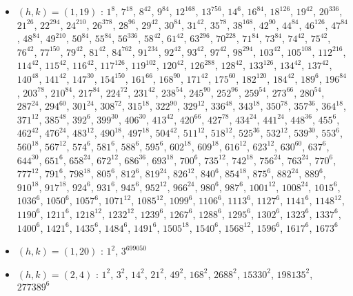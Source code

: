 \begin{itemize}
\item $(h,k)=(1,19)$ : $1^{8}$, $7^{18}$, $8^{42}$, $9^{84}$, $12^{168}$, $13^{756}$, $14^{6}$, $16^{84}$, $18^{126}$, $19^{42}$, $20^{336}$, $21^{26}$, $22^{294}$, $24^{210}$, $26^{378}$, $28^{96}$, $29^{42}$, $30^{84}$, $31^{42}$, $35^{78}$, $38^{168}$, $42^{90}$, $44^{84}$, $46^{126}$, $47^{84}$, $48^{84}$, $49^{210}$, $50^{84}$, $55^{84}$, $56^{336}$, $58^{42}$, $61^{42}$, $63^{296}$, $70^{228}$, $71^{84}$, $73^{84}$, $74^{42}$, $75^{42}$, $76^{42}$, $77^{150}$, $79^{42}$, $81^{42}$, $84^{762}$, $91^{234}$, $92^{42}$, $93^{42}$, $97^{42}$, $98^{294}$, $103^{42}$, $105^{108}$, $112^{216}$, $114^{42}$, $115^{42}$, $116^{42}$, $117^{126}$, $119^{102}$, $120^{42}$, $126^{288}$, $128^{42}$, $133^{126}$, $134^{42}$, $137^{42}$, $140^{48}$, $141^{42}$, $147^{30}$, $154^{150}$, $161^{66}$, $168^{90}$, $171^{42}$, $175^{60}$, $182^{120}$, $184^{42}$, $189^{6}$, $196^{84}$, $203^{78}$, $210^{84}$, $217^{84}$, $224^{72}$, $231^{42}$, $238^{54}$, $245^{90}$, $252^{96}$, $259^{54}$, $273^{66}$, $280^{54}$, $287^{24}$, $294^{60}$, $301^{24}$, $308^{72}$, $315^{18}$, $322^{90}$, $329^{12}$, $336^{48}$, $343^{18}$, $350^{78}$, $357^{36}$, $364^{18}$, $371^{12}$, $385^{48}$, $392^{6}$, $399^{30}$, $406^{30}$, $413^{42}$, $420^{66}$, $427^{78}$, $434^{24}$, $441^{24}$, $448^{36}$, $455^{6}$, $462^{42}$, $476^{24}$, $483^{12}$, $490^{18}$, $497^{18}$, $504^{42}$, $511^{12}$, $518^{12}$, $525^{36}$, $532^{12}$, $539^{30}$, $553^{6}$, $560^{18}$, $567^{12}$, $574^{6}$, $581^{6}$, $588^{6}$, $595^{6}$, $602^{18}$, $609^{18}$, $616^{12}$, $623^{12}$, $630^{60}$, $637^{6}$, $644^{30}$, $651^{6}$, $658^{24}$, $672^{12}$, $686^{36}$, $693^{18}$, $700^{6}$, $735^{12}$, $742^{18}$, $756^{24}$, $763^{24}$, $770^{6}$, $777^{12}$, $791^{6}$, $798^{18}$, $805^{6}$, $812^{6}$, $819^{24}$, $826^{12}$, $840^{6}$, $854^{18}$, $875^{6}$, $882^{24}$, $889^{6}$, $910^{18}$, $917^{18}$, $924^{6}$, $931^{6}$, $945^{6}$, $952^{12}$, $966^{24}$, $980^{6}$, $987^{6}$, $1001^{12}$, $1008^{24}$, $1015^{6}$, $1036^{6}$, $1050^{6}$, $1057^{6}$, $1071^{12}$, $1085^{12}$, $1099^{6}$, $1106^{6}$, $1113^{6}$, $1127^{6}$, $1141^{6}$, $1148^{12}$, $1190^{6}$, $1211^{6}$, $1218^{12}$, $1232^{12}$, $1239^{6}$, $1267^{6}$, $1288^{6}$, $1295^{6}$, $1302^{6}$, $1323^{6}$, $1337^{6}$, $1400^{6}$, $1421^{6}$, $1435^{6}$, $1484^{6}$, $1491^{6}$, $1505^{18}$, $1540^{6}$, $1568^{12}$, $1596^{6}$, $1617^{6}$, $1673^{6}$
\item $(h,k)=(1,20)$ : $1^{2}$, $3^{699050}$
\item $(h,k)=(2,4)$ : $1^{2}$, $3^{2}$, $14^{2}$, $21^{2}$, $49^{2}$, $168^{2}$, $2688^{2}$, $15330^{2}$, $198135^{2}$, $277389^{6}$

\end{itemize}
